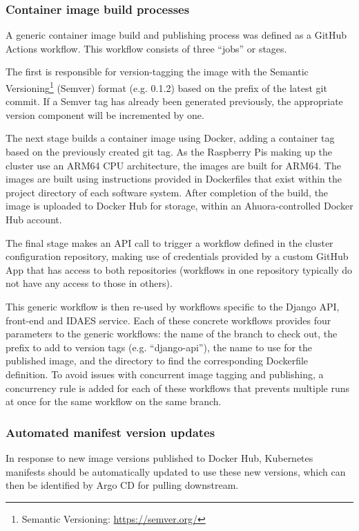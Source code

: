 \subsubsection{Container image build processes} \label{section:build-process}

A generic container image build and publishing process was defined as a GitHub Actions workflow. This workflow consists of three ``jobs'' or stages. 

The first is responsible for version-tagging the image with the Semantic Versioning\footnote{Semantic Versioning: \url{https://semver.org/}} (Semver) format (e.g. 0.1.2) based on the prefix of the latest git commit. If a Semver tag has already been generated previously, the appropriate version component will be incremented by one.

The next stage builds a container image using Docker, adding a container tag based on the previously created git tag. As the Raspberry Pis making up the cluster use an ARM64 CPU architecture, the images are built for ARM64. The images are built using instructions provided in Dockerfiles that exist within the project directory of each software system. After completion of the build, the image is uploaded to Docker Hub for storage, within an Ahuora-controlled Docker Hub account.

The final stage makes an API call to trigger a workflow defined in the cluster configuration repository, making use of credentials provided by a custom GitHub App that has access to both repositories (workflows in one repository typically do not have any access to those in others).

This generic workflow is then re-used by workflows specific to the Django API, front-end and IDAES service. Each of these concrete workflows provides four parameters to the generic workflows: the name of the branch to check out, the prefix to add to version tags (e.g. ``django-api''), the name to use for the published image, and the directory to find the corresponding Dockerfile definition. To avoid issues with concurrent image tagging and publishing, a concurrency rule is added for each of these workflows that prevents multiple runs at once for the same workflow on the same branch.

\subsubsection{Automated manifest version updates}

In response to new image versions published to Docker Hub, Kubernetes manifests should be automatically updated to use these new versions, which can then be identified by Argo CD for pulling downstream.

